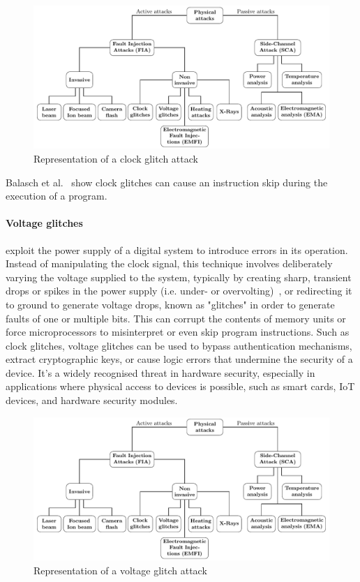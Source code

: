 \begin{figure}[ht]
    \centering
    \includegraphics[page=4]{c2_soa/img/physicalAttacks.pdf}
    \caption{Representation of a clock glitch attack}
    \label{fig:clock_glitch}
\end{figure}

Balasch et al.~\cite{BGV-11-fdtc} show clock glitches can cause an instruction skip during the execution of a program.

\paragraph{Voltage glitches} exploit the power supply of a digital system to introduce errors in its operation. Instead of manipulating the clock signal, this technique involves deliberately varying the voltage supplied to the system, typically by creating sharp, transient drops or spikes in the power supply (i.e. under- or overvolting)~\cite{BBPP-09-fdtc}, or redirecting it to ground to generate voltage drops, known as "glitches" in order to generate faults of one or multiple bits. This can corrupt the contents of memory units or force microprocessors to misinterpret or even skip program instructions.
Such as clock glitches, voltage glitches can be used to bypass authentication mechanisms, extract cryptographic keys, or cause logic errors that undermine the security of a device. It's a widely recognised threat in hardware security, especially in applications where physical access to devices is possible, such as smart cards, IoT devices, and hardware security modules.

\begin{figure}[ht]
    \centering
    \includegraphics[page=6, scale=1.25]{c2_soa/img/physicalAttacks.pdf}
    \caption{Representation of a voltage glitch attack}
    \label{fig:voltage_glitch}
\end{figure}

